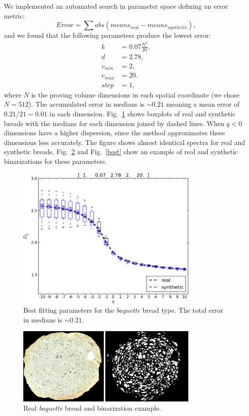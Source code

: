 \documentclass[spanish,a4paper,11pt,oneside,links]{report}
\begin{document}
We implemented an automated search in parameter space defining an error metric: 
\begin{equation*}
Error = \displaystyle \sum abs(means_{real}-means_{synthetic}),
\end{equation*}
and we found that the following parameters produce the lowest error:
\begin{align*}
k &= 0.07 \frac{N^{3}}{20} ,\\
d &=2.78,\\
v_{min} &=2,\\
v_{max} &=20.\\
step &=1,
\end{align*}
where $N$ is the proving volume dimensions in each spatial coordinate (we chose $N = 512$). 
The accumulated error in medians is $\sim 0.21$ meaning a mean error of $0.21/21 \sim 0.01$ in each dimension.
Fig.~\ref{bestboxplot} shows boxplots of real and synthetic breads with the medians for each dimension joined by dashed lines.
When $q < 0$ dimensions have a higher dispersion, since the method approximates these dimensions less accurately.
The figure shows almost identical spectra for real and synthetic breads. Fig.~\ref{realbin} and Fig.~\ref{best} show an example of real and synthetic binarizations for these parameters.


\begin{figure}[!ht]
\includegraphics[width=9cm]{figures/bestboxplot}
\caption{Best fitting parameters for the {\em baguette} bread type. The total error in medians is $\sim 0.21$.}
\label{bestboxplot}
\end{figure}

\begin{figure}[!ht]
\begin{center}
\includegraphics[width=9cm]{figures/realbin}
\caption{ Real {\em baguette} bread and binarization example.}
\label{realbin}
\end{center}
\end{figure}
\end{document}
